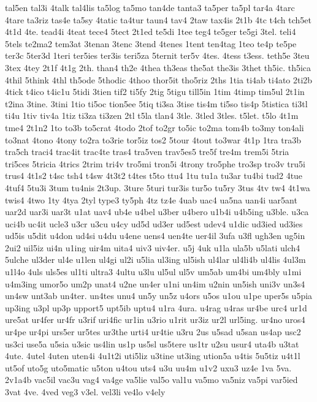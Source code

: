{tal5en
tal3i
4talk
tal4lis
ta5log
ta5mo
tan4de
tanta3
ta5per
ta5pl
tar4a
4tarc
4tare
ta3riz
tas4e
ta5sy
4tatic
ta4tur
taun4
tav4
2taw
tax4is
2t1b
4tc
t4ch
tch5et
4t1d
4te.
tead4i
4teat
tece4
5tect
2t1ed
te5di
1tee
teg4
te5ger
te5gi
3tel.
teli4
5tels
te2ma2
tem3at
3tenan
3tenc
3tend
4tenes
1tent
ten4tag
1teo
te4p
te5pe
ter3c
5ter3d
1teri
ter5ies
ter3is
teri5za
5ternit
ter5v
4tes.
4tess
t3ess.
teth5e
3teu
3tex
4tey
2t1f
4t1g
2th.
than4
th2e
4thea
th3eas
the5at
the3is
3thet
th5ic.
th5ica
4thil
5think
4thl
th5ode
5thodic
4thoo
thor5it
tho5riz
2ths
1tia
ti4ab
ti4ato
2ti2b
4tick
t4ico
t4ic1u
5tidi
3tien
tif2
ti5fy
2tig
5tigu
till5in
1tim
4timp
tim5ul
2t1in
t2ina
3tine.
3tini
1tio
ti5oc
tion5ee
5tiq
ti3sa
3tise
tis4m
ti5so
tis4p
5tistica
ti3tl
ti4u
1tiv
tiv4a
1tiz
ti3za
ti3zen
2tl
t5la
tlan4
3tle.
3tled
3tles.
t5let.
t5lo
4t1m
tme4
2t1n2
1to
to3b
to5crat
4todo
2tof
to2gr
to5ic
to2ma
tom4b
to3my
ton4ali
to3nat
4tono
4tony
to2ra
to3rie
tor5iz
tos2
5tour
4tout
to3war
4t1p
1tra
tra3b
tra5ch
traci4
trac4it
trac4te
tras4
tra5ven
trav5es5
tre5f
tre4m
trem5i
5tria
tri5ces
5tricia
4trics
2trim
tri4v
tro5mi
tron5i
4trony
tro5phe
tro3sp
tro3v
tru5i
trus4
4t1s2
t4sc
tsh4
t4sw
4t3t2
t4tes
t5to
ttu4
1tu
tu1a
tu3ar
tu4bi
tud2
4tue
4tuf4
5tu3i
3tum
tu4nis
2t3up.
3ture
5turi
tur3is
tur5o
tu5ry
3tus
4tv
tw4
4t1wa
twis4
4two
1ty
4tya
2tyl
type3
ty5ph
4tz
tz4e
4uab
uac4
ua5na
uan4i
uar5ant
uar2d
uar3i
uar3t
u1at
uav4
ub4e
u4bel
u3ber
u4bero
u1b4i
u4b5ing
u3ble.
u3ca
uci4b
uc4it
ucle3
u3cr
u3cu
u4cy
ud5d
ud3er
ud5est
udev4
u1dic
ud3ied
ud3ies
ud5is
u5dit
u4don
ud4si
u4du
u4ene
uens4
uen4te
uer4il
3ufa
u3fl
ugh3en
ug5in
2ui2
uil5iz
ui4n
u1ing
uir4m
uita4
uiv3
uiv4er.
u5j
4uk
u1la
ula5b
u5lati
ulch4
5ulche
ul3der
ul4e
u1len
ul4gi
ul2i
u5lia
ul3ing
ul5ish
ul4lar
ul4li4b
ul4lis
4ul3m
u1l4o
4uls
uls5es
ul1ti
ultra3
4ultu
u3lu
ul5ul
ul5v
um5ab
um4bi
um4bly
u1mi
u4m3ing
umor5o
um2p
unat4
u2ne
un4er
u1ni
un4im
u2nin
un5ish
uni3v
un3s4
un4sw
unt3ab
un4ter.
un4tes
unu4
un5y
un5z
u4ors
u5os
u1ou
u1pe
uper5s
u5pia
up3ing
u3pl
up3p
upport5
upt5ib
uptu4
u1ra
4ura.
u4rag
u4ras
ur4be
urc4
ur1d
ure5at
ur4fer
ur4fr
u3rif
uri4fic
ur1in
u3rio
u1rit
ur3iz
ur2l
url5ing.
ur4no
uros4
ur4pe
ur4pi
urs5er
ur5tes
ur3the
urti4
ur4tie
u3ru
2us
u5sad
u5san
us4ap
usc2
us3ci
use5a
u5sia
u3sic
us4lin
us1p
us5sl
us5tere
us1tr
u2su
usur4
uta4b
u3tat
4ute.
4utel
4uten
uten4i
4u1t2i
uti5liz
u3tine
ut3ing
ution5a
u4tis
5u5tiz
u4t1l
ut5of
uto5g
uto5matic
u5ton
u4tou
uts4
u3u
uu4m
u1v2
uxu3
uz4e
1va
5va.
2v1a4b
vac5il
vac3u
vag4
va4ge
va5lie
val5o
val1u
va5mo
va5niz
va5pi
var5ied
3vat
4ve.
4ved
veg3
v3el.
vel3li
ve4lo
v4ely
}
